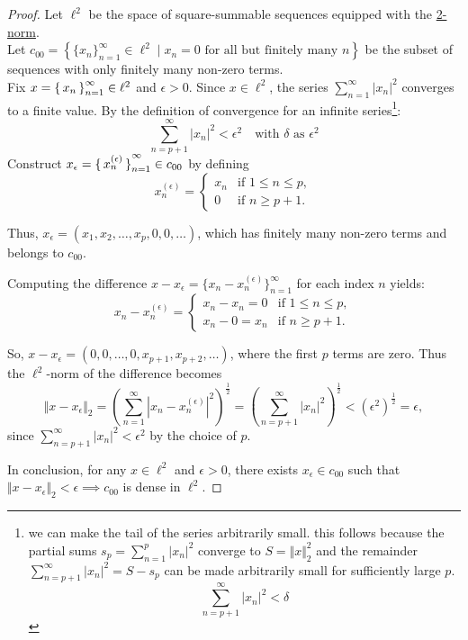 \documentclass[dvipsnames,12pt]{exam}
\newcommand{\norm}[1]{\Vert #1 \Vert}
\theoremstyle{definition}
\begin{document}
\begin{proof}
    Let \hyperref[l2]{$\ell^2$} be the space of square-summable sequences equipped with the \hyperref[norm]{2-norm}.\\

    Let $c_{00} = \left\{ \{x_n\}_{n=1}^\infty \in \ell^2 \mid x_n = 0 \text{ for all but finitely many } n \right\}$ be the subset of sequences with only finitely many non-zero terms.\\

    Fix $x = \set{x_n}_{n=1}^\infty \in \ell^2$ and $\epsilon > 0$. Since $x \in \ell^2$, the series $\sum^\infty_{n=1}|x_n|^2$ converges to a finite value. By the definition of convergence for an infinite series\footnote{we can make the tail of the series arbitrarily small. this follows because the partial sums $s_p = \sum_{n=1}^p |x_n|^2$ converge to $S=\norm{x}_2^2$ and the remainder $\sum_{n=p+1}^\infty |x_n|^2 = S - s_p$ can be made arbitrarily small for sufficiently large $p$.
    \[
        \sum^\infty_{n=p+1}|x_n|^2 < \delta
    \]}:
    \[
        \sum^\infty_{n=p+1}|x_n|^2 < \epsilon^2\quad\text{with }\delta\text{ as }\epsilon^2
    \]
    Construct $x_\epsilon = \set{x_n^{(\epsilon)}}^\infty_{n=1} \in c_{00}$ by defining
    \[
    x_n^{(\epsilon)} = \begin{cases} 
        x_n & \text{if } 1 \leq n \leq p, \\
        0 & \text{if } n \geq p + 1.
    \end{cases}
    \]

    Thus, $x_\epsilon = (x_1, x_2, \ldots, x_p, 0, 0, \ldots)$, which has finitely many non-zero terms and belongs to $c_{00}$.

    Computing the difference $x - x_\epsilon = \{x_n - x_n^{(\epsilon)}\}_{n=1}^\infty$ for each index $n$ yields:
    \[
    x_n - x_n^{(\epsilon)} = \begin{cases} 
        x_n - x_n = 0 & \text{if } 1 \leq n \leq p, \\
        x_n - 0 = x_n & \text{if } n \geq p + 1.
    \end{cases}
    \]

    So, $x - x_\epsilon = (0, 0, \ldots, 0, x_{p + 1}, x_{p + 2}, \ldots)$, where the first $p$ terms are zero. Thus the $\ell^2$-norm of the difference becomes
    \[
        \norm{x-x_\epsilon}_2 = \left(\sum_{n=1}^\infty |x_n - x_n^{(\epsilon)}|^2 \right )^\frac{1}{2} = \left( \sum_{n=p+1}^\infty |x_n|^2 \right )^\frac{1}{2} < (\epsilon^2)^\frac{1}{2} = \epsilon,
    \]
    since $\sum_{n=p + 1}^\infty |x_n|^2 < \epsilon^2$ by the choice of $p$.

    In conclusion, for any $x \in \ell^2$ and $\epsilon > 0$, there exists $x_\epsilon \in c_{00}$ such that $\norm{x - x_\epsilon}_2 < \epsilon \implies c_{00}$ is dense in $\ell^2$.

\end{proof}
\end{document}
